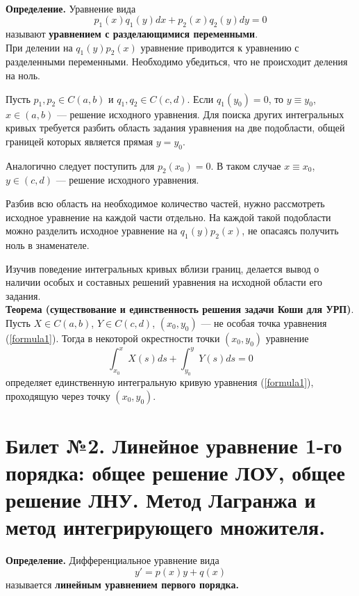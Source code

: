 \documentclass{article}
\begin{document}
\\
\textbf{Определение.} Уравнение вида
\begin{equation}
    p_1(x)q_1(y)dx + p_2(x)q_2(y)dy = 0 \label{formula3}
\end{equation}
называют \textbf{уравнением с разделающимися переменными}.\\

При делении на $q_1(y)p_2(x)$ уравнение приводится к уравнению с разделенными переменными. Необходимо убедиться, что не происходит деления на ноль.

Пусть $p_1, p_2 \in C(a,b)$ и $q_1, q_2 \in C(c,d)$. Если $q_1(y_0) = 0$, то $y \equiv y_0$, $x \in (a,b)$ --- решение исходного уравнения. Для поиска других интегральных кривых требуется разбить область задания уравнения на две подобласти, общей границей которых является прямая $y = y_0$.

Аналогично следует поступить для $p_2(x_0) = 0$. В таком случае $x \equiv x_0$, $y \in (c,d)$ --- решение исходного уравнения.

Разбив всю область на необходимое количество частей, нужно рассмотреть исходное уравнение на каждой части отдельно. На каждой такой подобласти можно разделить исходное уравнение на $q_1(y)p_2(x)$, не опасаясь получить ноль в знаменателе.

Изучив поведение интегральных кривых вблизи границ, делается вывод о наличии особых и составных решений уравнения на исходной области его задания.\\

\textbf{Теорема (существование и единственность решения задачи Коши для УРП)}. Пусть $X \in C(a,b)$, $Y \in C(c,d)$, $(x_0, y_0)$ --- не особая точка уравнения (\ref{formula1}). Тогда в некоторой окрестности точки $(x_0, y_0)$ уравнение
\begin{equation*}
    \int_{x_0}^{x} X(s)ds + \int_{y_0}^{y} Y(s)ds = 0
\end{equation*}
определяет единственную интегральную кривую уравнения (\ref{formula1}), проходящую через точку $(x_0, y_0)$.

\section{Билет №2. Линейное уравнение 1-го порядка: общее решение ЛОУ, общее решение
ЛНУ. Метод Лагранжа и метод интегрирующего множителя.}
\label{bil2}
\textbf{Определение.} Дифференциальное уравнение вида
\begin{equation}
    y' = p(x)y + q(x) \label{lnu}
\end{equation}
называется \textbf{линейным уравнением первого порядка.}\\
\end{document}
